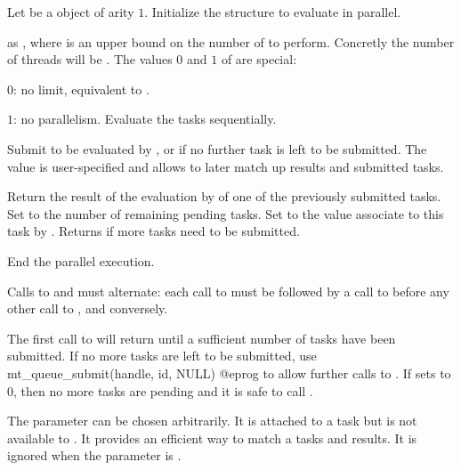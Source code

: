  Let 
be a  object of arity $1$.  Initialize the structure 
to evaluate  in parallel.

as , where  is an upper bound on the number
of  to perform. Concretly the number of
threads will be . The values $0$ and $1$ of 
are special:

\item $0$: no limit, equivalent to .

\item $1$: no parallelism. Evaluate the tasks sequentially.

 Submit
 to be evaluated by , or  if no further task
is left to be submitted. The value  is user-specified and allows
to later match up results and submitted tasks.

Return the result of the evaluation by  of one of the previously
submitted tasks. Set  to the number of remaining pending tasks.
Set  to the value associate to this task by
.  Returns  if more tasks need to be
submitted.

 End the parallel execution.

Calls to  and  must alternate: each
call to  must be followed by a call to
 before any other call to ,
and conversely.

The first call to  will return  until a
sufficient number of tasks have been submitted. If no more tasks are left
to be submitted, use
\bprog
  mt_queue_submit(handle, id, NULL)
@eprog\noindent
to allow further calls to .  If  sets
 to $0$, then no more tasks are pending and it is safe to call
.

The parameter  can be chosen arbitrarily. It is attached to a
task but is not available to .  It provides an efficient way to
match a tasks and results. It is ignored when the parameter  is
.

